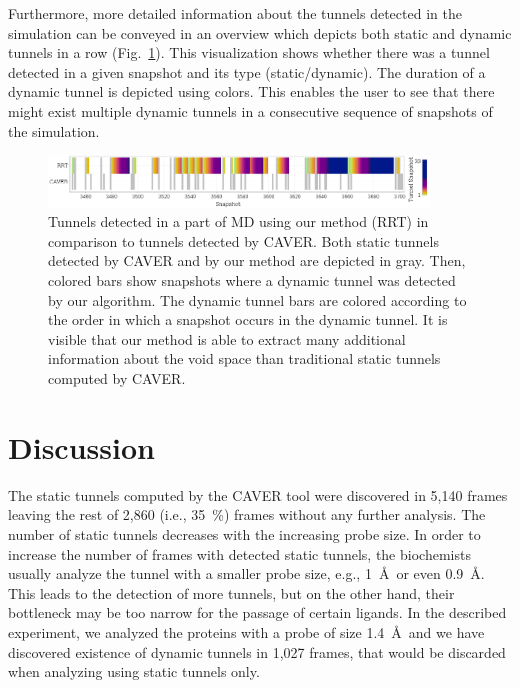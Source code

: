 \documentclass[usletter, 10pt, conference]{svjour3}      %
\begin{document}
Furthermore, more detailed information about the tunnels detected in the simulation can be conveyed in an overview which depicts both static and dynamic tunnels in a row (Fig.~\ref{fig::caver34}).
This visualization shows whether there was a tunnel detected in a given snapshot and its type (static/dynamic).
The duration of a dynamic tunnel is depicted using colors.
This enables the user to see that there might exist multiple dynamic tunnels in a consecutive sequence of snapshots of the simulation.


\begin{figure}
\centering
\includegraphics[width=0.9\textwidth]{fig/caver3450-3700_colored}
\caption{\label{fig::caver34}
Tunnels detected in a part of MD using our method (RRT) in comparison to tunnels detected by CAVER.
Both static tunnels detected by CAVER and by our method are depicted in gray.
Then, colored bars show snapshots where a dynamic tunnel was detected by our algorithm.
The dynamic tunnel bars are colored according to the order in which a snapshot occurs in the dynamic tunnel.
It is visible that our method is able to extract many additional information about the void space than traditional static tunnels computed by CAVER.
}
\end{figure}




\section{Discussion}

The static tunnels computed by the CAVER tool were discovered in 5,140 frames leaving the rest of 2,860 (i.e., 35~\%) 
frames without any further analysis.
The number of static tunnels decreases with the increasing probe size. 
In order to increase the number of frames with detected static tunnels, the biochemists usually analyze the tunnel with a smaller probe size, e.g., 1~\AA\ or even 0.9~\AA.
This leads to the detection of more tunnels, but on the other hand, their bottleneck may be too narrow for the passage of certain ligands.
In the described experiment, we analyzed the proteins with a probe of size 1.4~\AA\ and we have discovered existence of dynamic tunnels in 1,027 frames, that would be discarded when analyzing using static tunnels only.
\end{document}
